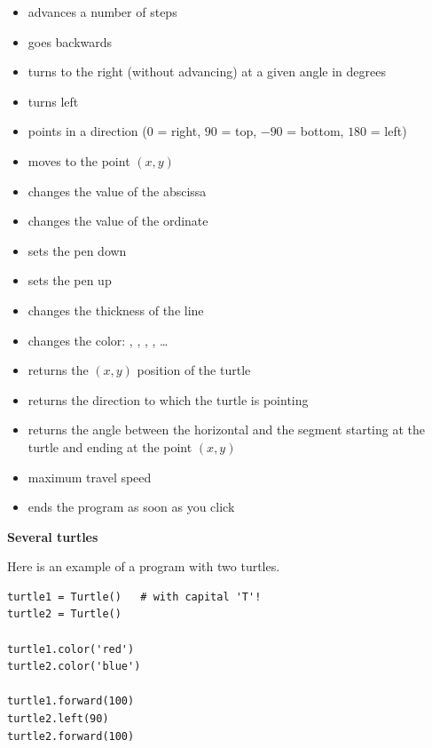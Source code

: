 \documentclass[11pt,class=report,crop=false]{standalone}
\begin{document}
\begin{itemize}
  \item {} advances a number of steps
  \item {} goes backwards
  \item {} turns to the right (without advancing) at a given angle in degrees
  \item {} turns left
  \item {} points in a direction ($0$ = right, $90$ = top, $-90$ = bottom, $180$ = left)
  \item {} moves to the point $(x,y)$
  \item {} changes the value of the abscissa
  \item {} changes the value of the ordinate
  
  
  \item {} sets the pen down
  \item {} sets the pen up
  \item {} changes the thickness of the line
  \item {} changes the color: , , , , \ldots
  
  \item {} returns the $(x,y)$ position of the turtle
  \item {} returns the direction  to which the turtle is pointing
  \item {} returns the angle between the horizontal and the segment starting at the turtle and ending at the point $(x,y)$
  \item {} \quad maximum travel speed  
  \item {} ends the program as soon as you click
\end{itemize}

\bigskip

\textbf{Several turtles}

Here is an example of a program with two turtles.
\begin{lstlisting}
turtle1 = Turtle()   # with capital 'T'!
turtle2 = Turtle()

turtle1.color('red')
turtle2.color('blue')

turtle1.forward(100)
turtle2.left(90)
turtle2.forward(100)
\end{lstlisting}
\end{document}
